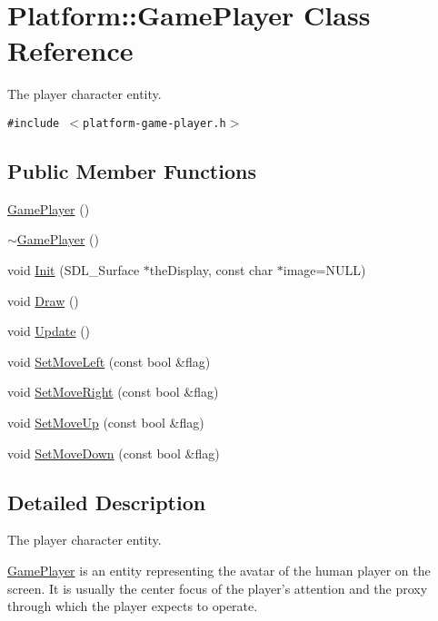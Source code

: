 \hypertarget{class_platform_1_1_game_player}{
\section{Platform::GamePlayer Class Reference}
\label{d4/d4e/class_platform_1_1_game_player}
}
The player character entity.  


{\tt \#include $<$platform-game-player.h$>$}

\subsection*{Public Member Functions}
\begin{CompactItemize}
\item 
\hyperlink{class_platform_1_1_game_player_ae7a4bb8381fe5377a0db83488dacb56}{GamePlayer} ()
\item 
\hyperlink{class_platform_1_1_game_player_6ca29b4989ceeef4b05e1404fa4bcdd8}{$\sim$GamePlayer} ()
\item 
void \hyperlink{class_platform_1_1_game_player_1a8a150999ae7f2abf6362ecc5d9923d}{Init} (SDL\_\-Surface $\ast$theDisplay, const char $\ast$image=NULL)
\item 
void \hyperlink{class_platform_1_1_game_player_60966ecce397b55523f66b96753435aa}{Draw} ()
\item 
void \hyperlink{class_platform_1_1_game_player_cebe99ba854db79cf0c0100d85af6485}{Update} ()
\item 
void \hyperlink{class_platform_1_1_game_player_300162a6d120462c82781da770bc4530}{SetMoveLeft} (const bool \&flag)
\item 
void \hyperlink{class_platform_1_1_game_player_9be44cb10d1dcf3c8eeae08266e76e34}{SetMoveRight} (const bool \&flag)
\item 
void \hyperlink{class_platform_1_1_game_player_630364b025ecf7959adcfbcd772b4e17}{SetMoveUp} (const bool \&flag)
\item 
void \hyperlink{class_platform_1_1_game_player_bb1ee12d248d3a1e43ae2fd692671356}{SetMoveDown} (const bool \&flag)
\end{CompactItemize}


\subsection{Detailed Description}
The player character entity. 

\hyperlink{class_platform_1_1_game_player}{GamePlayer} is an entity representing the avatar of the human player on the screen. It is usually the center focus of the player's attention and the proxy through which the player expects to operate. 

